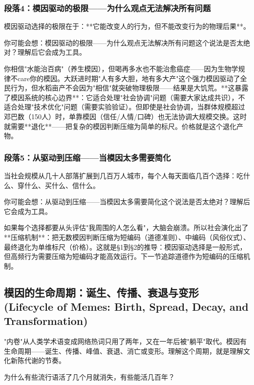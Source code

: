 \documentclass[openany, a4paper, 12pt]{book}
\newenvironment{motivation}{
	\vspace{0.5em}
	\begin{tcolorbox}[
		colback=gray!10,           %
		colframe=gray!60,          %
		title=\textit{本章动机 (Motivation)},
		fonttitle=\bfseries,
		arc=0mm,                   %
		leftrule=3mm               %
		]
		\small \itshape %
	}{
	\end{tcolorbox}
	\vspace{1em}
}
\begin{document}
\begin{motivation}
\begin{motivation}
\begin{motivation}
	\subsubsection*{段落4：模因驱动的极限——为什么观点无法解决所有问题}
模因驱动选择的极限在于：**它能改变人的行为，但不能改变行为的物理后果**。
	\begin{tcolorbox}[colback=yellow!5, title=\textit{读者行为预测}]
		你可能会想：模因驱动的极限——为什么观点无法解决所有问题这个说法是否太绝对？理解后它会成为工具。
	\end{tcolorbox}

你相信"水能治百病"（养生模因），但喝再多水也不能治愈癌症——因为生物学规律不care你的模因。大跃进时期"人有多大胆，地有多大产"这个强力模因驱动了全民行为，但水稻亩产不会因为"相信"就突破物理极限——结果是大饥荒。**这暴露了模因系统的核心边界**：它适合处理"社会协调"问题（需要大家达成共识），不适合处理"技术优化"问题（需要实验验证）。但即使是社会协调，当群体规模超过邓巴数（150人）时，单靠模因（信任/人情/口碑）也无法协调大规模交换。这时就需要**退化**——把复杂的模因判断压缩为简单的标尺。价格就是这个退化产物。

	\subsubsection*{段落5：从驱动到压缩——当模因太多需要简化}
当社会规模从几十人部落扩展到几百万人城市，每个人每天面临几百个选择：吃什么、穿什么、买什么、信什么。
	\begin{tcolorbox}[colback=yellow!5, title=\textit{读者行为预测}]
		你可能会想：从驱动到压缩——当模因太多需要简化这个说法是否太绝对？理解后它会成为工具。
	\end{tcolorbox}

如果每个选择都要从头评估"我周围的人怎么看"，大脑会崩溃。所以社会演化出了**压缩机制**：把无数模因判断压缩为短编码（道德准则）、中编码（风俗仪式）、最终退化为单维标尺（价格）。这就是§1到§2的推导：模因驱动选择是一般形式，但高频行为需要压缩为短编码才能高效运行。下一节追踪道德作为短编码的压缩机制。

\subsection{模因的生命周期：诞生、传播、衰退与变形 (Lifecycle of Memes: Birth, Spread, Decay, and Transformation)}
\begin{motivation}
	"内卷"从人类学术语变成网络热词只用了两年，又在一年后被"躺平"取代。模因有生命周期——诞生、传播、峰值、衰退、消亡或变形。理解这个周期，就是理解文化新陈代谢的节奏。
\end{motivation}
\begin{questionbox}
	为什么有些流行语活了几个月就消失，有些能活几百年？
\end{questionbox}


\end{motivation}
\end{motivation}
\end{motivation}
\end{document}
